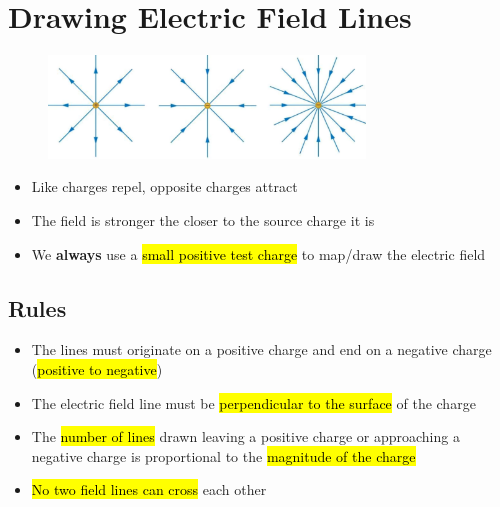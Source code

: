 \documentclass[a4paper,12pt]{article}
\begin{document}
\section{Drawing Electric Field Lines}
\begin{figure}[H]
    \centering
    \includegraphics[width=0.75\textwidth]{fieldlines}
\end{figure}
\begin{itemize}
    \item{Like charges repel, opposite charges attract}
    \item{The field is stronger the closer to the source charge it is}
    \item{We \textbf{always} use a \hl{small positive test charge} to map/draw the electric field}
\end{itemize}

\subsection{Rules}
\begin{itemize}
    \item{The lines must originate on a positive charge and end on a negative charge (\hl{positive to negative})}
    \item{The electric field line must be \hl{perpendicular to the surface} of the charge}
    \item{The \hl{number of lines} drawn leaving a positive charge or approaching a negative charge is proportional to the \hl{magnitude of the charge}}
    \item{\hl{No two field lines can cross} each other}
\end{itemize}
\end{document}
